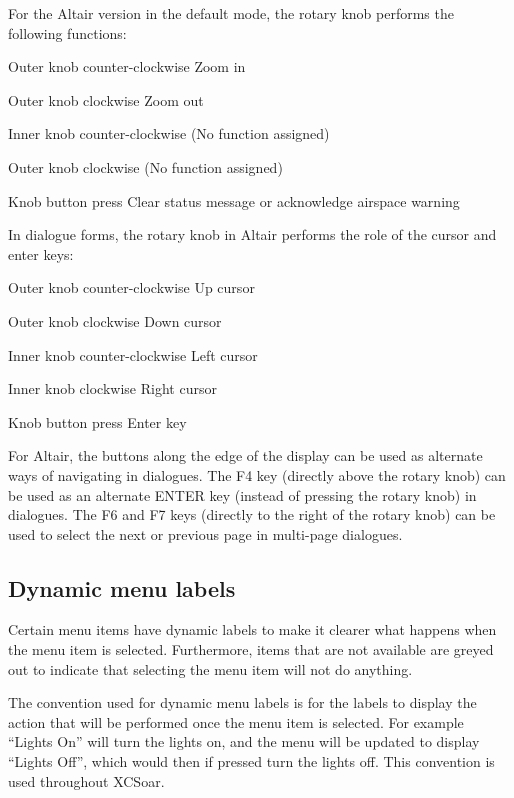 For the Altair version in the default mode, the rotary knob performs
the following functions:
\begin{jspecs}
\item[Outer knob counter-clockwise] Zoom in
\item[Outer knob clockwise] Zoom out
\item[Inner knob counter-clockwise] (No function assigned)
\item[Outer knob clockwise] (No function assigned)
\item[Knob button press] Clear status message or acknowledge airspace warning
\end{jspecs}

In dialogue forms, the rotary knob in Altair performs the role of the cursor and
enter keys:
\begin{jspecs}
\item[Outer knob counter-clockwise] Up cursor
\item[Outer knob clockwise] Down cursor
\item[Inner knob counter-clockwise] Left cursor
\item[Inner knob clockwise] Right cursor
\item[Knob button press] Enter key
\end{jspecs}

For Altair, the buttons along the edge of the display can be used as
alternate ways of navigating in dialogues.  The F4 key (directly above
the rotary knob) can be used as an alternate ENTER key (instead of
pressing the rotary knob) in dialogues.  The F6 and F7 keys (directly to
the right of the rotary knob) can be used to select the next or
previous page in multi-page dialogues.

\subsection*{Dynamic menu labels}
Certain menu items have dynamic labels to make it clearer what happens when the
menu item is selected.  Furthermore, items that are not available are greyed
out to indicate that selecting the menu item will not do anything.

The convention used for dynamic menu labels is for the labels to display the
action that will be performed once the menu item is selected. For example 
``Lights On'' will turn the lights on, and the menu will be updated to display
``Lights Off'', which would then if pressed turn the lights off. This
convention is used throughout XCSoar.

